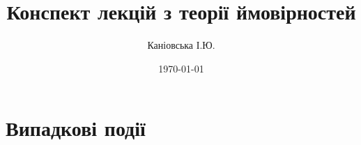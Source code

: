 \documentclass{report}
\author{Каніовська І.Ю.}
\title{Конспект лекцій з теорії ймовірностей}
\date{\today}
\begin{document}
 
    \maketitle
    \tableofcontents
    \chapter{Випадкові події}
        
\end{document}

